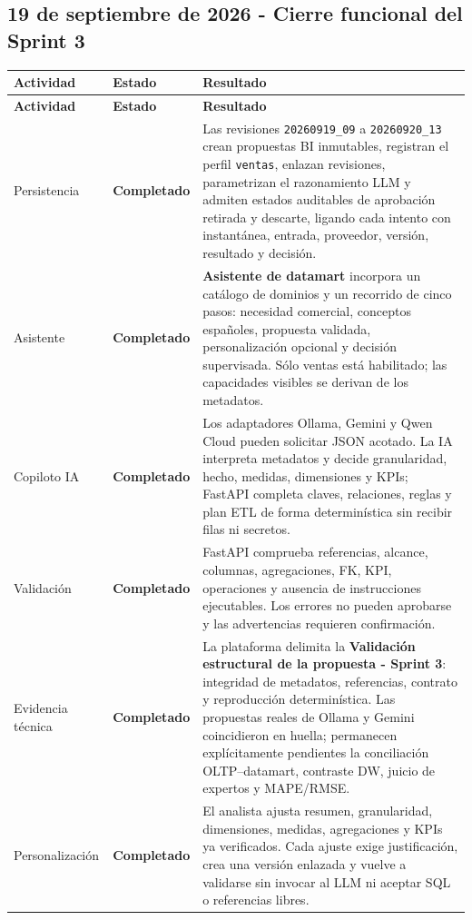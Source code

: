 \documentclass[11pt,letterpaper]{article}
\newcommand{\statusok}{\textcolor{deepgreen}{\textbf{Completado}}}
\newcommand{\file}[1]{\texttt{#1}}
\begin{document}
\subsection{19 de septiembre de 2026 - Cierre funcional del Sprint 3}

\begin{longtable}{@{}p{}p{}p{}@{}}
  \toprule
  \textbf{Actividad} & \textbf{Estado} & \textbf{Resultado} \\
  \midrule
  \endfirsthead
  \toprule
  \textbf{Actividad} & \textbf{Estado} & \textbf{Resultado} \\
  \midrule
  \endhead
  Persistencia & \statusok & Las revisiones \file{20260919\_09} a \file{20260920\_13} crean propuestas BI inmutables, registran el perfil \file{ventas}, enlazan revisiones, parametrizan el razonamiento LLM y admiten estados auditables de aprobación retirada y descarte, ligando cada intento con instantánea, entrada, proveedor, versión, resultado y decisión. \\
  Asistente & \statusok & \textbf{Asistente de datamart} incorpora un catálogo de dominios y un recorrido de cinco pasos: necesidad comercial, conceptos españoles, propuesta validada, personalización opcional y decisión supervisada. Sólo ventas está habilitado; las capacidades visibles se derivan de los metadatos. \\
  Copiloto IA & \statusok & Los adaptadores Ollama, Gemini y Qwen Cloud pueden solicitar JSON acotado. La IA interpreta metadatos y decide granularidad, hecho, medidas, dimensiones y KPIs; FastAPI completa claves, relaciones, reglas y plan ETL de forma determinística sin recibir filas ni secretos. \\
  Validación & \statusok & FastAPI comprueba referencias, alcance, columnas, agregaciones, FK, KPI, operaciones y ausencia de instrucciones ejecutables. Los errores no pueden aprobarse y las advertencias requieren confirmación. \\
  Evidencia técnica & \statusok & La plataforma delimita la \textbf{Validación estructural de la propuesta - Sprint 3}: integridad de metadatos, referencias, contrato y reproducción determinística. Las propuestas reales de Ollama y Gemini coincidieron en huella; permanecen explícitamente pendientes la conciliación OLTP--datamart, contraste DW, juicio de expertos y MAPE/RMSE. \\
  Personalización & \statusok & El analista ajusta resumen, granularidad, dimensiones, medidas, agregaciones y KPIs ya verificados. Cada ajuste exige justificación, crea una versión enlazada y vuelve a validarse sin invocar al LLM ni aceptar SQL o referencias libres. \\

\end{longtable}
\end{document}
